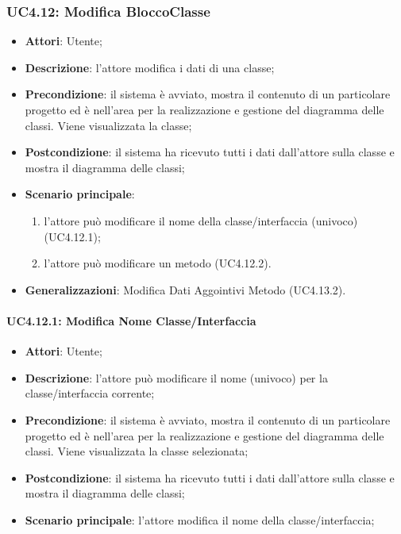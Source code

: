 \subsubsection{UC4.12: Modifica BloccoClasse}
\label{UC4.12}
\begin{itemize}
	\item \textbf{Attori}: Utente;
	\item \textbf{Descrizione}: l'attore modifica i dati di una classe;
	\item \textbf{Precondizione}: il sistema è avviato, mostra il contenuto di un particolare progetto ed è nell'area per la realizzazione e gestione del diagramma delle classi. Viene visualizzata la classe;
	\item \textbf{Postcondizione}: il sistema ha ricevuto tutti i dati dall'attore sulla classe e mostra il diagramma delle classi;
	\item \textbf{Scenario principale}:
	\begin{enumerate}
		\item l'attore può modificare il nome della classe/interfaccia (univoco) (UC4.12.1);
		\item l'attore può modificare un metodo (UC4.12.2).
	\end{enumerate}
	\item \textbf{Generalizzazioni}: Modifica Dati Aggointivi Metodo (UC4.13.2).%
\end{itemize}

\paragraph{UC4.12.1: Modifica Nome Classe/Interfaccia}
\label{UC4.12.1}
\begin{itemize}
	\item \textbf{Attori}: Utente;
	\item \textbf{Descrizione}: l'attore può modificare il nome (univoco) per la classe/interfaccia corrente;
	\item \textbf{Precondizione}: il sistema è avviato, mostra il contenuto di un particolare progetto ed è nell'area per la realizzazione e gestione del diagramma delle classi. Viene visualizzata la classe selezionata;
	\item \textbf{Postcondizione}: il sistema ha ricevuto tutti i dati dall'attore sulla classe e mostra il diagramma delle classi;
	\item \textbf{Scenario principale}: l'attore modifica il nome della classe/interfaccia;
\end{itemize}

